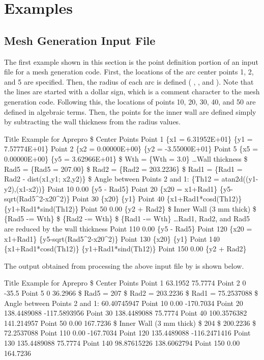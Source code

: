 \chapter{Examples}\label{ch:examples}

\section{Mesh Generation Input File}

The first example shown in this section is the point definition portion of an input 
file for a mesh generation code. First, the locations of the arc center points 
1, 2, and 5 are specified. Then, the radius of each arc is defined ( , 
, and ). Note that the lines are started with a dollar sign, which 
is a comment character to the mesh generation code. Following this, the locations 
of points 10, 20, 30, 40, and 50 are defined in algebraic terms. Then, the points 
for the inner wall are defined simply by subtracting the wall thickness from the 
radius values.
\begin{apinp}
Title          
Example for Aprepro     
\$  Center  Points        
Point  1  \{x1  =  6.31952E+01\}  \{y1  =  7.57774E+01\}
Point  2  \{x2  =  0.00000E+00\}  \{y2  =  -3.55000E+01\}
Point  5  \{x5  =  0.00000E+00\}  \{y5  =  3.62966E+01\}
\$  Wth  =  \{Wth  =  3.0\}      
\ldots Wall thickness
\$  Rad5  =  \{Rad5  =  207.00\}
\$  Rad2  =  \{Rad2  =  203.2236\}
\$  Rad1  =  \{Rad1  =  Rad2  -  dist(x1,y1;  x2,y2)\}
\$  Angle  between  Points  2  and  1:  \{Th12  =  atan2d((y1-y2),(x1-x2))\}
Point  10  0.00    \{y5  -  Rad5\}
Point  20  \{x20  =  x1+Rad1\}    \{y5-sqrt(Rad5\^{}2-x20\^{}2)\}
Point  30  \{x20\}    \{y1\}  
Point  40  \{x1+Rad1*cosd(Th12)\}  \{y1+Rad1*sind(Th12)\}
Point  50  0.00    \{y2  +  Rad2\}
\$  Inner Wall (3  mm  thick) 
\$  \{Rad5  -=  Wth\}        
\$  \{Rad2  -=  Wth\}        
\$  \{Rad1  -=  Wth\}        
\ldots Rad1, Rad2, and Rad5 are reduced by the wall thickness
Point  110  0.00    \{y5  -  Rad5\}
Point  120  \{x20  =  x1+Rad1\}    \{y5-sqrt(Rad5\^{}2-x20\^{}2)\}
Point  130  \{x20\}    \{y1\}  
Point  140  \{x1+Rad1*cosd(Th12)\}  \{y1+Rad1*sind(Th12)\}
Point  150  0.00    \{y2  +  Rad2\}
\end{apinp}
The output obtained from processing the above input file by \aprepro{} is shown below.
\begin{apout}
Title          
Example for  Aprepro
\$  Center  Points
Point  1  63.1952  75.7774    
Point  2  0  -35.5    
Point  5  0  36.2966    
\$  Rad5  =  207
\$  Rad2  =  203.2236
\$  Rad1  =  75.2537088
\$  Angle between  Points  2  and  1:  60.40745947
Point  10  0.00  -170.7034
Point  20  138.4489088  -117.5893956
Point  30  138.4489088  75.7774
Point  40  100.3576382  141.214957
Point  50  0.00  167.7236
\$  Inner Wall  (3  mm  thick)
\$  204      
\$  200.2236   
\$  72.2537088
Point  110  0.00  -167.7034
Point  120  135.4489088  -116.2471416
Point  130  135.4489088  75.7774
Point  140  98.87615226  138.6062794
Point  150  0.00  164.7236
\end{apout}

